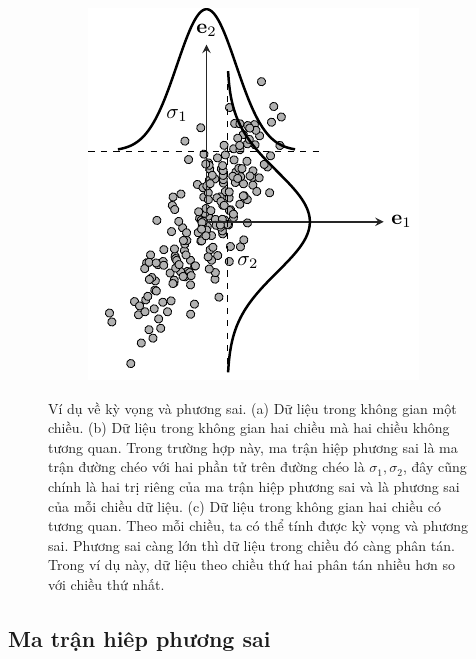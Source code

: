 \begin{figure}[t]
\begin{subfigure}{0.325\textwidth}
     \includegraphics[width=0.99\linewidth]{Chapters/07_DimemsionalityReduction/27_pca/latex/pca_var0.pdf}
     \caption{}
     \label{fig:27_2c}
     \end{subfigure}
     \caption{
     Ví dụ về kỳ vọng và phương sai. (a) Dữ liệu trong không gian
     một chiều. (b) Dữ liệu trong không gian hai chiều mà hai chiều
     không tương quan. Trong trường hợp này, ma trận hiệp phương sai là ma trận
     đường chéo với hai phần tử trên đường chéo  là $\sigma_1, \sigma_2$, đây
     cũng chính là hai trị riêng của ma trận hiệp phương sai và là phương sai
     của mỗi chiều dữ liệu. (c) Dữ liệu trong không gian hai chiều có tương
     quan. Theo mỗi chiều, ta có thể tính được kỳ vọng và phương sai. Phương sai
     càng lớn thì dữ liệu trong chiều đó càng phân tán. Trong ví dụ này, dữ liệu
     theo chiều thứ hai phân tán nhiều hơn so với chiều thứ nhất. }
     \label{fig:27_2}
 \end{figure}

\subsection{Ma trận hiêp phương sai}
 

